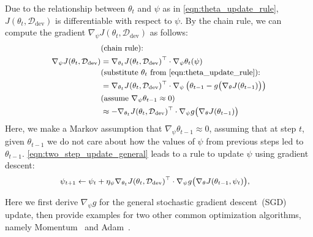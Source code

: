 Due to the relationship between $\theta_t$ and $\psi$ as in \autoref{eqn:theta_update_rule}, $J(\theta_t, \mathcal{D}_\text{dev})$ is differentiable with respect to $\psi$. 
By the chain rule, we can compute the gradient $\nabla_\psi J(\theta_t, \mathcal{D}_\text{dev})$ as follows:
\begin{equation}
  \label{eqn:two_step_update_general}
   \small
  \begin{aligned}
      &\text{(chain rule):} \\
    \nabla_\psi J(\theta_t, \mathcal{D}_\text{dev})
      &= \nabla_{\theta_t} J(\theta_t, \mathcal{D}_\text{dev})^\top \cdot \nabla_\psi \theta_t(\psi) \\
      &\text{(substitute $\theta_t$ from \autoref{eqn:theta_update_rule}):} \\
      &= \nabla_{\theta_t} J(\theta_t, \mathcal{D}_\text{dev})^\top \cdot \nabla_\psi \left( \theta_{t-1} - g\big( \nabla_\theta J(\theta_{t-1}) \big) \right) \\
      &\text{(assume $\nabla_\psi \theta_{t-1} \approx 0$)} \\
      &\approx -\nabla_{\theta_t} J(\theta_t, \mathcal{D}_\text{dev})^\top \cdot \nabla_\psi g\big( \nabla_\theta J(\theta_{t-1}) \big)  %
  \end{aligned}
\end{equation}
Here, we make a Markov assumption that $\nabla_\psi \theta_{t-1} \approx 0$, assuming that at step $t$, given $\theta_{t-1}$ we do not care about how the values of $\psi$ from previous steps led to $\theta_{t-1}$. \autoref{eqn:two_step_update_general} leads to a rule to update $\psi$ using gradient descent:
\begin{equation}
  \label{eqn:psi_update_rule}
   \small
  \begin{aligned}
    \psi_{t+1} 
      &\leftarrow \psi_t + \eta_\psi \nabla_{\theta_t} J(\theta_t, \mathcal{D}_\text{dev})^\top \cdot \nabla_\psi g\big( \nabla_\theta J(\theta_{t-1}, \psi_t) \big),
  \end{aligned}
\end{equation}


Here we first derive $\nabla_\psi g$ for the general stochastic gradient descent~(SGD) update, then provide examples for two other common optimization algorithms, namely Momentum~\citep{nesterov} and Adam~\citep{adam}.

